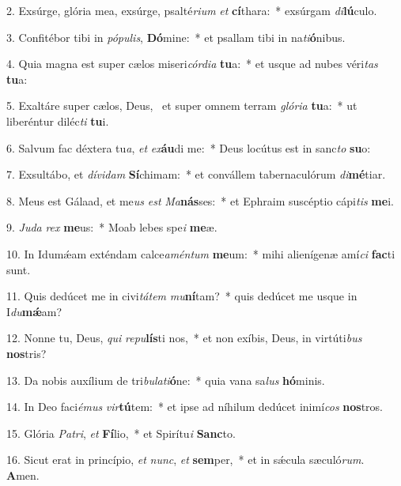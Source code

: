 2. Exsúrge, glória mea, exsúrge, psalté\textit{ri}\textit{um} \textit{et} \textbf{cí}thara:~*  exsúrgam \textit{di}\textbf{lú}culo.\

3. Confitébor tibi in \textit{pó}\textit{pu}\textit{lis}, \textbf{Dó}mine:~*  et psallam tibi in na\textit{ti}\textbf{ó}nibus.\

4. Quia magna est super cælos miseri\textit{cór}\textit{di}\textit{a} \textbf{tu}a:~*  et usque ad nubes véri\textit{tas} \textbf{tu}a:\

5. Exaltáre super cælos, Deus, \dag\  et super omnem terram \textit{gló}\textit{ri}\textit{a} \textbf{tu}a:~*  ut liberéntur diléc\textit{ti} \textbf{tu}i.\

6. Salvum fac déxtera tu\textit{a}, \textit{et} \textit{ex}\textbf{áu}di me:~*  Deus locútus est in sanc\textit{to} \textbf{su}o:\

7. Exsultábo, et \textit{dí}\textit{vi}\textit{dam} \textbf{Sí}chimam:~*  et convállem tabernaculórum \textit{di}\textbf{mé}tiar.\

8. Meus est Gálaad, et me\textit{us} \textit{est} \textit{Ma}\textbf{nás}ses:~*  et Ephraim suscéptio cápi\textit{tis} \textbf{me}i.\

9. \textit{Ju}\textit{da} \textit{rex} \textbf{me}us:~*  Moab lebes spe\textit{i} \textbf{me}æ.\

10. In Idumǽam exténdam calce\textit{a}\textit{mén}\textit{tum} \textbf{me}um:~*  mihi alienígenæ amí\textit{ci} \textbf{fac}ti sunt.\

11. Quis dedúcet me in civi\textit{tá}\textit{tem} \textit{mu}\textbf{ní}tam?~*  quis dedúcet me usque in I\textit{du}\textbf{mǽ}am?\

12. Nonne tu, Deus, \textit{qui} \textit{re}\textit{pu}\textbf{lís}ti nos,~*  et non exíbis, Deus, in virtúti\textit{bus} \textbf{nos}tris?\

13. Da nobis auxílium de tri\textit{bu}\textit{la}\textit{ti}\textbf{ó}ne:~*  quia vana sa\textit{lus} \textbf{hó}minis.\

14. In Deo faci\textit{é}\textit{mus} \textit{vir}\textbf{tú}tem:~*  et ipse ad níhilum dedúcet inimí\textit{cos} \textbf{nos}tros.\

15. Glória \textit{Pa}\textit{tri}, \textit{et} \textbf{Fí}lio,~*  et Spirítu\textit{i} \textbf{Sanc}to.\

16. Sicut erat in princípio, \textit{et} \textit{nunc}, \textit{et} \textbf{sem}per,~*  et in sǽcula sæculó\textit{rum}. \textbf{A}men.\

